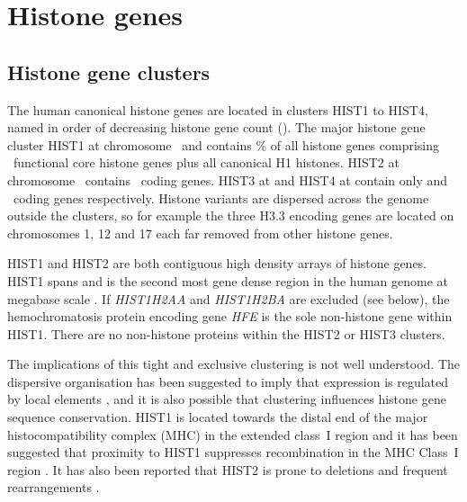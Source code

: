\section{Histone genes}

  \subsection{Histone gene clusters}
    The human canonical histone genes are located in clusters HIST1 to HIST4, 
	named in order of decreasing histone gene count ().
	The major histone gene cluster HIST1 at chromosome~\HISTOneLocus{} and 
	contains \% of all histone genes 
	comprising \CodingGenesInHISTOne{}~functional core histone genes plus all canonical H1 histones. 
	HIST2 at chromosome~\HISTTwoLocus{} contains \CodingGenesInHISTTwo{}~coding genes. 
	HIST3 at \HISTThreeLocus{} and HIST4 at \HISTTFourLocus{} 
	contain only \CodingGenesInHISTThree{} and \CodingGenesInHISTFour{}~coding genes respectively. 
	Histone variants are dispersed across the genome outside the clusters, 
	so for example the three H3.3 encoding genes are located on chromosomes 1, 12 and 17 
	each far removed from other histone genes.

	HIST1 and HIST2 are both contiguous high density arrays of histone genes. 
	HIST1 spans \HISTOneSpan{} 
	and is the second most gene dense region in the human genome at megabase scale \citep{MHC-III-analysis}.
	If \textit{HIST1H2AA} and \textit{HIST1H2BA} are excluded (see below), 
	the hemochromatosis protein encoding gene \textit{HFE} is the sole non-histone gene within HIST1. 
	There are no non-histone proteins within the HIST2 or HIST3 clusters. 

	The implications of this tight and exclusive clustering is not well understood. 
	The dispersive organisation has been suggested to imply that expression is regulated by local elements \citep{close-regulators}, 
	and it is also possible that clustering influences histone gene sequence conservation. 
	HIST1 is located towards the distal end of the major histocompatibility complex (MHC) in the extended class~I region \citep{MHC-I-transcript, MHC-complete-sequencing-1999} 
	and it has been suggested that proximity to HIST1 suppresses recombination in the MHC Class~I region \citep{MHC-repressed-by-HIST}. 
	It has also been reported that HIST2 is prone to deletions and frequent rearrangements \citep{HISTTwo-prone-deletion-discovery, HISTTwo-prone-deletion-focus}. 

